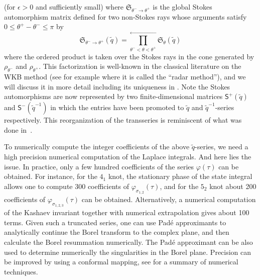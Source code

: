 \documentclass[12pt,reqno]{amsart}
\theoremstyle{definition}
\def\IZ{\mathbb{Z}}
\def\tq{\tilde{q}}
\def\mf{\mathfrak}
\def\ms{\mathsf}
\begin{document}
(for $\epsilon>0$ and sufficiently small) where
$\mf{S}_{\theta^-\to\theta^+}$ is the global Stokes automorphism matrix
defined for two non-Stokes rays whose arguments satisfy
$0\leq \theta^+-\theta^- \leq \pi$ by
\begin{equation}
  \mf{S}_{\theta^-\to \theta^+}(\tq) =
  \prod_{\theta^-<\theta<\theta^+}^{\longleftarrow}
  \mf{S}_{\theta}(\tq)
  \label{eq:Sfac}
\end{equation}
where the ordered product is taken over the Stokes rays in the cone
generated by $\rho_{\theta^-}$ and $\rho_{\theta^+}$.  This
factorization is well-known in the classical literature on the WKB
method (see for example \cite{voros} where it is called the ``radar
method''), and we will discuss it in more detail including its
uniqueness in \cite{GGM-peacock}.
%
%
Note the Stokes automorphisms are now represented by two
finite-dimensional matrices $\ms{S}^+(\tq)$ and $\ms{S}^-(\tq^{-1})$ in
which the entries have been promoted to $\tq$ and $\tq^{-1}$-series
respectively. This reorganization of the transseries is reminiscent of
what was done in~\cite{costin-costin}.

To numerically compute the integer coefficients of the above
$\tq$-series, we need a high precision numerical computation of the
Laplace integrals.  And here lies the issue.  In practice, only a few
hundred coefficients of the series $\varphi(\tau)$ can be
obtained. For instance, for the $4_1$ knot, the stationary phase of
the state integral allows one to compute 300 coefficients of
$\varphi_{\sigma_{1,2}}(\tau)$, and for the $5_2$ knot about 200
coefficients of $\varphi_{\sigma_{1,2,3}}(\tau)$ can be
obtained. Alternatively, a numerical computation of the Kashaev
invariant together with numerical extrapolation gives about 100
terms. Given such a truncated series, one can use Pad\'e approximants
to analytically continue the Borel transform to the complex plane, and
then calculate the Borel resummation numerically. The Pad\'e
approximant can be also used to determine numerically the
singularities in the Borel plane. Precision can be improved by using a
conformal mapping, see \cite{caliceti} for a summary of numerical
techniques.
\end{document}
